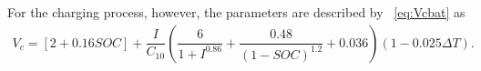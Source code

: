 \documentclass[review]{elsarticle}
\begin{document}
%
%
For the charging process, however, the parameters are described by ~\eqref{eq:Vcbat} as
%
\begin{multline}
\label{eq:Vcbat}
V_{c} = [2+0.16SOC]+ \dfrac{I}{C_{10}} \left( \dfrac{6}{1+I^{0.86}} + \dfrac{0.48}{(1-SOC)^{1.2}} + 0.036  \right) (1-0.025 \Delta T).
\end{multline}
\end{document}
